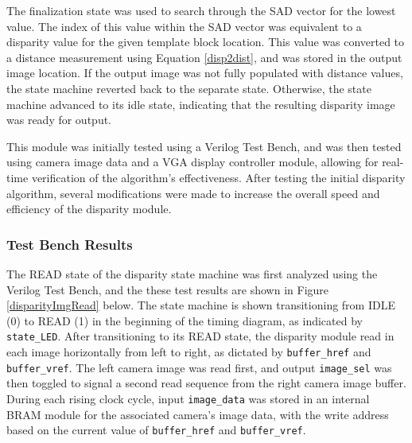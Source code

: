 The finalization state was used to search through the SAD vector for the lowest value. The index of this value within the SAD vector was equivalent to  a disparity value for the given template block location. This value was  converted to a distance measurement using Equation \ref{disp2dist}, and was stored in the output image location. If the output image was not fully populated with distance values, the state machine reverted back to the separate state. Otherwise, the state machine advanced to its idle state, indicating that the resulting disparity image was ready for output. 
\par
This module was initially tested using a Verilog Test Bench, and was then tested using camera image data and a VGA display controller module, allowing for real-time verification of the algorithm's effectiveness. After testing the initial disparity algorithm, several modifications were made to increase the overall speed and efficiency of the disparity module. 
\subsubsection{Test Bench Results}
The READ state of the disparity state machine was first analyzed using the Verilog Test Bench, and the these test results are shown in Figure \ref{disparityImgRead} below. The state machine is shown transitioning from IDLE (0) to READ (1) in the beginning of the timing diagram, as indicated by \texttt{state\_LED}. After transitioning to its READ state, the disparity module read in each image horizontally from left to right, as dictated by \texttt{buffer\_href} and \texttt{buffer\_vref}. The left camera image was read first, and output \texttt{image\_sel} was then toggled to signal a second read sequence from the right camera image buffer. During each rising clock cycle, input \texttt{image\_data} was stored in an internal BRAM module for the associated camera's image data, with the write address based on the current value of \texttt{buffer\_href} and \texttt{buffer\_vref}. 

